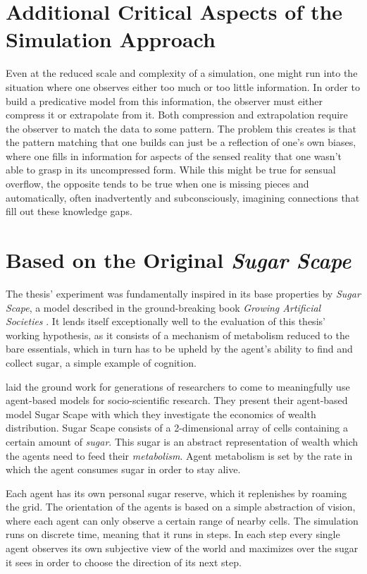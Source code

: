 \section{Additional Critical Aspects of the Simulation Approach}
Even at the reduced scale and complexity of a simulation, one might run into the situation where one observes either too much or too little information. In order to build a predicative model from this information, the observer must either compress it or extrapolate from it. Both compression and extrapolation require the observer to match the data to some pattern. The problem this creates is that the pattern matching that one builds can just be a reflection of one's own biases, where one fills in information for aspects of the sensed reality that one wasn't able to grasp in its uncompressed form. While this might be true for sensual overflow, the opposite tends to be true when one is missing pieces and automatically, often inadvertently and subconsciously, imagining connections that fill out these knowledge gaps.

\section{Based on the Original \emph{Sugar Scape}}
The thesis' experiment was fundamentally inspired in its base properties by \emph{Sugar Scape}, a model described in the ground-breaking book \textit{Growing Artificial Societies} \citep{Epstein1996}. It lends itself exceptionally well to the evaluation of this thesis' working hypothesis, as it consists of a mechanism of metabolism reduced to the bare essentials, which in turn has to be upheld by the agent's ability to find and collect sugar, a simple example of cognition.

\cite{Epstein1996} laid the ground work for generations of researchers to come to meaningfully use agent-based models for socio-scientific research. They present their agent-based model Sugar Scape with which they investigate the economics of wealth distribution. Sugar Scape consists of a 2-dimensional array of cells containing a certain amount of \textit{sugar}. This sugar is an abstract representation of wealth which the agents need to feed their \textit{metabolism}. Agent metabolism is set by the rate in which the agent consumes sugar in order to stay alive.

Each agent has its own personal sugar reserve, which it replenishes by roaming the grid. The orientation of the agents is based on a simple abstraction of vision, where each agent can only observe a certain range of nearby cells. The simulation runs on discrete time, meaning that it runs in steps. In each step every single agent observes its own subjective view of the world and maximizes over the sugar it sees in order to choose the direction of its next step.

